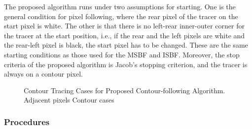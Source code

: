 The proposed algorithm runs under two assumptions for starting. One is the general condition for pixel following, where the rear pixel of the tracer on the start pixel is white. The other is that there is no left-rear inner-outer corner for the tracer at the start position, i.e., if the rear and the left pixels are white and the rear-left pixel is black, the start pixel has to be changed. These are the same starting conditions as those used for the MSBF and ISBF. Moreover, the stop criteria of the proposed algorithm is Jacob’s stopping criterion, and the tracer is always on a contour pixel. 

\begin{figure}[htbp]
	\centering

	\caption{Contour Tracing Cases for Proposed Contour-following Algorithm. \protect{} Adjacent pixels \protect{} Contour cases}
	\label{fig:image9}
\end{figure}


\subsubsection{Procedures}


